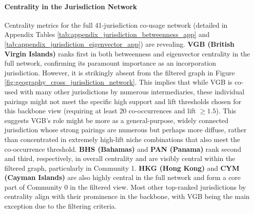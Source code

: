 \paragraph{Centrality in the Jurisdiction Network}
Centrality metrics for the full 41-jurisdiction co-usage network (detailed in Appendix Tables \ref{tab:appendix_jurisdiction_betweenness_app} and \ref{tab:appendix_jurisdiction_eigenvector_app}) are revealing.
\textbf{VGB (British Virgin Islands)} ranks first in both betweenness and eigenvector centrality in the full network, confirming its paramount importance as an incorporation jurisdiction. However, it is strikingly absent from the filtered graph in Figure \ref{fig:geography_cross_jurisdiction_network}. This implies that while VGB is co-used with many other jurisdictions by numerous intermediaries, these individual pairings might not meet the specific high support and lift thresholds chosen for this backbone view (requiring at least 20 co-occurrences and lift $\ge 1.5$). This suggests VGB's role might be more as a general-purpose, widely connected jurisdiction whose strong pairings are numerous but perhaps more diffuse, rather than concentrated in extremely high-lift niche combinations that also meet the co-occurrence threshold.
\textbf{BHS (Bahamas)} and \textbf{PAN (Panama)} rank second and third, respectively, in overall centrality and are visibly central within the filtered graph, particularly in Community 1. \textbf{HKG (Hong Kong)} and \textbf{CYM (Cayman Islands)} are also highly central in the full network and form a core part of Community 0 in the filtered view. Most other top-ranked jurisdictions by centrality align with their prominence in the backbone, with VGB being the main exception due to the filtering criteria.

